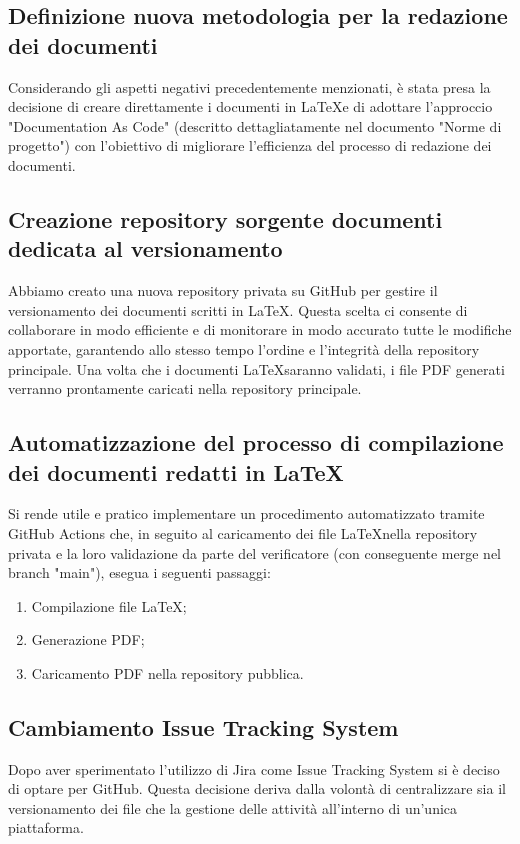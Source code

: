 \documentclass{article}
\begin{document}
    \subsection{Definizione nuova metodologia per la redazione dei documenti}
    Considerando gli aspetti negativi precedentemente menzionati, è stata presa la decisione di creare direttamente i documenti in \LaTeX e di adottare l'approccio "Documentation As Code" (descritto dettagliatamente nel documento "Norme di progetto") con l'obiettivo di migliorare l'efficienza del processo di redazione dei documenti.    
    \subsection{Creazione repository sorgente documenti dedicata al versionamento}
    Abbiamo creato una nuova repository privata su GitHub per gestire il versionamento dei documenti scritti in \LaTeX. Questa scelta ci consente di collaborare in modo efficiente e di monitorare in modo accurato tutte le modifiche apportate, garantendo allo stesso tempo l'ordine e l'integrità della repository principale. Una volta che i documenti \LaTeX saranno validati, i file PDF generati verranno prontamente caricati nella repository principale.  

    \subsection{Automatizzazione del processo di compilazione dei documenti redatti in \LaTeX}
    Si rende utile e pratico implementare un procedimento automatizzato tramite GitHub Actions che, in seguito al caricamento dei file \LaTeX nella repository privata e la loro validazione da parte del verificatore (con conseguente merge nel branch "main"), esegua i seguenti passaggi:  
    \begin{enumerate}
        \item Compilazione file \LaTeX;
        \item Generazione PDF;
        \item Caricamento PDF nella repository pubblica.       
    \end{enumerate}

    \subsection{Cambiamento Issue Tracking System}
    Dopo aver sperimentato l’utilizzo di Jira come Issue Tracking System si è deciso di optare per GitHub. Questa decisione deriva dalla volontà di centralizzare sia il versionamento dei file che la gestione delle attività all'interno di un'unica piattaforma.  
\end{document}
